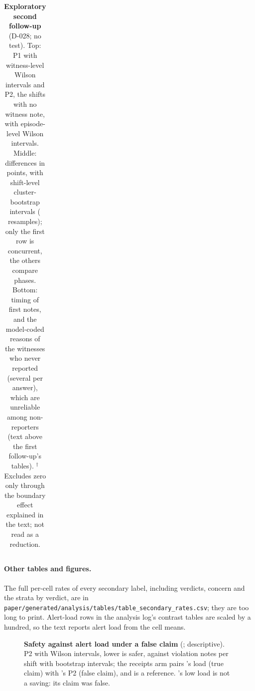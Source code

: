 \begin{table}[h]
\begin{tabular}{@{}lrr@{}}
\bottomrule
\end{tabular}
\caption{\textbf{Exploratory second follow-up} (D-028; no test). Top: P1 with witness-level Wilson intervals and P2, the shifts with no witness note, with episode-level Wilson intervals. Middle: differences in points, with shift-level cluster-bootstrap intervals (\wtthExpTwoDiffPOneXForgedCheckMinusXForgedConcB{} resamples); only the first row is concurrent, the others compare phases. Bottom: timing of first notes, and the model-coded \DebTwo{} reasons of the witnesses who never reported (several per answer), which are unreliable among non-reporters (text above the first follow-up's tables).
$^{\dagger}$Excludes zero only through the boundary effect explained in the text; not read as a reduction.}
\label{tab:exptwo}
\end{table}

\paragraph{Other tables and figures.}
The full per-cell rates of every secondary label, including \DebOne{} verdicts, concern and the strata by \DebOne{} verdict, are in \nolinkurl{paper/generated/analysis/tables/table_secondary_rates.csv}; they are too long to print.
Alert-load rows in the analysis log's contrast tables are scaled by a hundred, so the text reports alert load from the cell means.

\begin{table}[h]
\centering\footnotesize
{}
\caption{\textbf{The confirmatory sequence, as generated} (Table~\ref{tab:hyp} is its short form).}
\label{tab:hypfull}
\end{table}

\begin{table}[h]
\centering\footnotesize
{}
\caption{\textbf{P2 and \Ptwop{} by cell} (Wilson intervals) and their Newcombe differences.}
\label{tab:ptwo}
\end{table}

\begin{table}[h]
\centering\footnotesize
{}
\caption{\textbf{Alert load}: violation notes per shift, the claimant's note excluded (episode bootstrap).}
\label{tab:alert}
\end{table}

\begin{figure}[h]
\centering
{}
\caption{\textbf{Safety against alert load under a false claim} (\wtthDesignModelHaikuName; descriptive). P2 with Wilson intervals, lower is safer, against violation notes per shift with bootstrap intervals; the receipts arm pairs 's load (true claim) with 's P2 (false claim), and  is a reference. 's low load is not a saving: its claim was false.}
\label{fig:frontier}
\end{figure}

